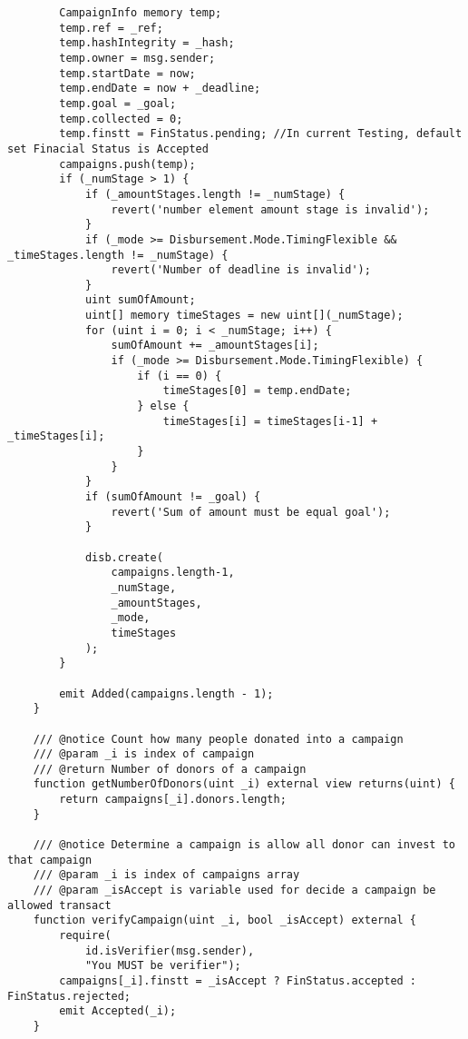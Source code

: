 \documentclass[../main-report.tex]{subfiles}
\begin{document}
\begin{lstlisting}
        CampaignInfo memory temp;
        temp.ref = _ref;
        temp.hashIntegrity = _hash;
        temp.owner = msg.sender;
        temp.startDate = now;
        temp.endDate = now + _deadline;
        temp.goal = _goal;
        temp.collected = 0;
        temp.finstt = FinStatus.pending; //In current Testing, default set Finacial Status is Accepted
        campaigns.push(temp);
        if (_numStage > 1) {
            if (_amountStages.length != _numStage) {
                revert('number element amount stage is invalid');
            }
            if (_mode >= Disbursement.Mode.TimingFlexible && _timeStages.length != _numStage) {
                revert('Number of deadline is invalid');
            }
            uint sumOfAmount;
            uint[] memory timeStages = new uint[](_numStage);
            for (uint i = 0; i < _numStage; i++) {
                sumOfAmount += _amountStages[i];
                if (_mode >= Disbursement.Mode.TimingFlexible) {
                    if (i == 0) {
                        timeStages[0] = temp.endDate;
                    } else {
                        timeStages[i] = timeStages[i-1] + _timeStages[i];
                    }
                }
            }
            if (sumOfAmount != _goal) {
                revert('Sum of amount must be equal goal');
            }

            disb.create(
                campaigns.length-1,
                _numStage,
                _amountStages,
                _mode,
                timeStages
            );
        }

        emit Added(campaigns.length - 1);
    }

    /// @notice Count how many people donated into a campaign
    /// @param _i is index of campaign
    /// @return Number of donors of a campaign
    function getNumberOfDonors(uint _i) external view returns(uint) {
        return campaigns[_i].donors.length;
    }

    /// @notice Determine a campaign is allow all donor can invest to that campaign
    /// @param _i is index of campaigns array
    /// @param _isAccept is variable used for decide a campaign be allowed transact
    function verifyCampaign(uint _i, bool _isAccept) external {
        require(
            id.isVerifier(msg.sender),
            "You MUST be verifier");
        campaigns[_i].finstt = _isAccept ? FinStatus.accepted : FinStatus.rejected;
        emit Accepted(_i);
    }


\end{lstlisting}
\end{document}

